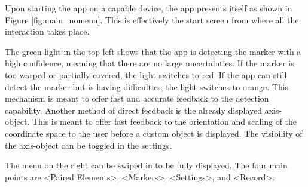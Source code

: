 Upon starting the app on a capable device, the app presents itself as shown in Figure \ref{fig:main_nomenu}.
This is effectively the start screen from where all the interaction takes place.

The green light in the top left shows that the app is detecting the marker with a high confidence, meaning that there are no large uncertainties.
If the marker is too warped or partially covered, the light switches to red.
If the app can still detect the marker but is having difficulties, the light switches to orange.
This mechanism is meant to offer fast and accurate feedback to the detection capability.
Another method of direct feedback is the already displayed axis-object.
This is meant to offer fast feedback to the orientation and scaling of the coordinate space to the user before a custom object is displayed.
The visibility of the axis-object can be toggled in the settings.

The menu on the right can be swiped in to be fully displayed.
The four main points are <Paired Elements>, <Markers>, <Settings>, and <Record>.

